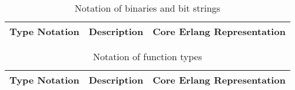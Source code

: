 \begin{table}[H]
  \centering
  \begin{tabularx}{\textwidth}{|c|>{\centering\arraybackslash}X|>{\centering\arraybackslash}X|}
    \hline
      Type Notation & Description & Core Erlang Representation \\
    \hline \hline
    \hline
  \end{tabularx}
  \caption{Notation of binaries and bit strings}
  \label{tab:notation_binary_types}
\end{table}

\begin{table}[H]
  \centering
  \begin{tabularx}{\textwidth}{|c|>{\centering\arraybackslash}X|>{\centering\arraybackslash}X|}
    \hline
      Type Notation & Description & Core Erlang Representation \\
    \hline \hline
    \hline
  \end{tabularx}
  \caption{Notation of function types}
  \label{tab:notation_funs}
\end{table}


